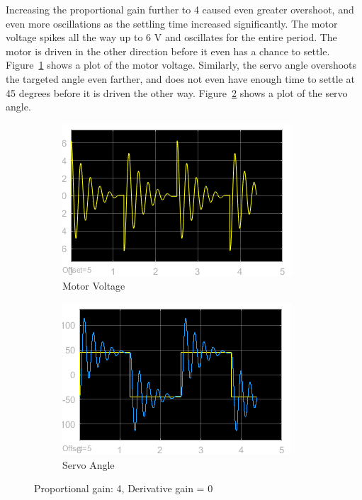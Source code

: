 \documentclass[12pt]{article}
\begin{document}
Increasing the proportional gain further to 4 caused even greater overshoot, and even more oscillations as the settling time increased significantly. The motor voltage spikes all the way up to 6 V and oscillates for the entire period. The motor is driven in the other direction before it even has a chance to settle. Figure~\ref{fig:x_volt} shows a plot of the motor voltage. Similarly, the servo angle overshoots the targeted angle even farther, and does not even have enough time to settle at 45 degrees before it is driven the other way. Figure~\ref{fig:x_angle} shows a plot of the servo angle.
\begin{figure}[h!]
    \centering
    \begin{subfigure}[b]{0.49\textwidth}
        \includegraphics[width=\textwidth]{x_voltage}
        \caption{\label{fig:x_volt}Motor Voltage}
    \end{subfigure}
    \begin{subfigure}[b]{0.49\textwidth}
        \includegraphics[width=\textwidth]{x_angle}
        \caption{\label{fig:x_angle}Servo Angle}
    \end{subfigure}
    \caption{\label{fig:x} Proportional gain: 4, Derivative gain = 0}
\end{figure}
\end{document}

